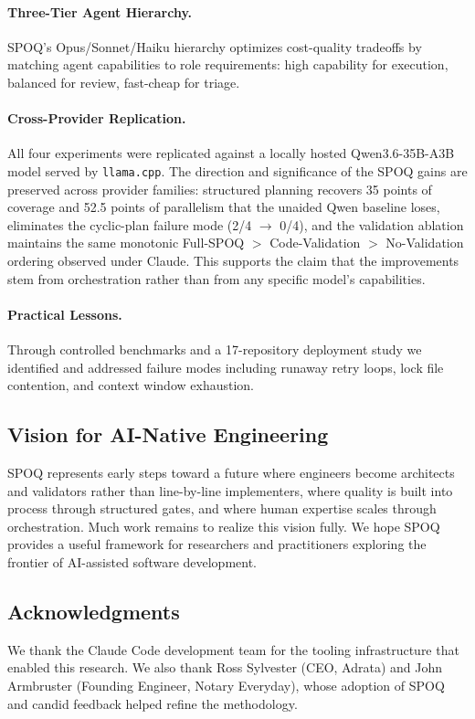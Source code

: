 \paragraph{Three-Tier Agent Hierarchy.}
SPOQ's Opus/Sonnet/Haiku hierarchy optimizes cost-quality tradeoffs by
matching agent capabilities to role requirements: high capability for
execution, balanced for review, fast-cheap for triage.

\paragraph{Cross-Provider Replication.}
All four experiments were replicated against a locally hosted
Qwen3.6-35B-A3B model served by \texttt{llama.cpp}. The direction and
significance of the SPOQ gains are preserved across provider families:
structured planning recovers 35 points of coverage and 52.5 points of
parallelism that the unaided Qwen baseline loses, eliminates the
cyclic-plan failure mode (2/4 $\to$ 0/4), and the validation ablation
maintains the same monotonic Full-SPOQ $>$ Code-Validation $>$
No-Validation ordering observed under Claude. This supports the claim
that the improvements stem from orchestration rather than from any
specific model's capabilities.

\paragraph{Practical Lessons.}
Through controlled benchmarks and a 17-repository deployment study we
identified and addressed failure modes including runaway retry loops,
lock file contention, and context window exhaustion.

\subsection{Vision for AI-Native Engineering}

SPOQ represents early steps toward a future where engineers become
architects and validators rather than line-by-line implementers, where
quality is built into process through structured gates, and where human
expertise scales through orchestration. Much work remains to realize this
vision fully. We hope SPOQ provides a useful framework for researchers
and practitioners exploring the frontier of AI-assisted software
development.

\subsection*{Acknowledgments}

We thank the Claude Code development team for the tooling infrastructure
that enabled this research. We also thank Ross Sylvester (CEO, Adrata) and
John Armbruster (Founding Engineer, Notary Everyday), whose adoption of
SPOQ and candid feedback helped refine the methodology.
